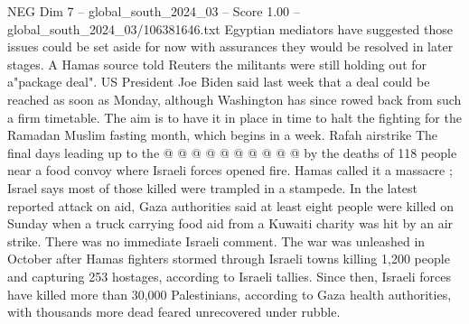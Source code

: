 \begin{textsample}{NEG Dim 7 – global\_south\_2024\_03 – Score 1.00 – global\_south\_2024\_03/106381646.txt}
Egyptian mediators have suggested those issues could be set aside for now with assurances they would be resolved in later stages.
A Hamas source told Reuters the militants were still holding out for a"package deal".
US President Joe Biden said last week that a deal could be reached as soon as Monday, although Washington has since rowed back from such a firm timetable.
The aim is to have it in place in time to halt the fighting for the Ramadan Muslim fasting month, which begins in a week.
Rafah airstrike The final days leading up to the @ @ @ @ @ @ @ @ @ @ by the deaths of 118 people near a food convoy where Israeli forces opened fire.
Hamas called it a massacre ; Israel says most of those killed were trampled in a stampede.
In the latest reported attack on aid, Gaza authorities said at least eight people were killed on Sunday when a truck carrying food aid from a Kuwaiti charity was hit by an air strike.
There was no immediate Israeli comment.
The war was unleashed in October after Hamas fighters stormed through Israeli towns killing 1,200 people and capturing 253 hostages, according to Israeli tallies.
Since then, Israeli forces have killed more than 30,000 Palestinians, according to Gaza health authorities, with thousands more dead feared unrecovered under rubble.

\end{textsample}
